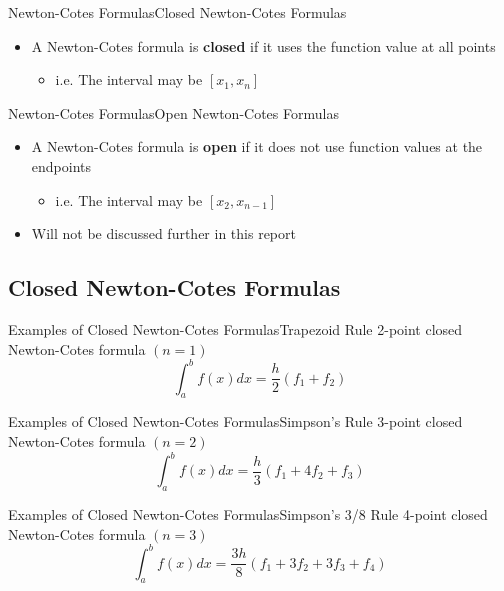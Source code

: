 \documentclass{beamer}
\begin{document}
\begin{frame}{Newton-Cotes Formulas}{Closed Newton-Cotes Formulas}
  \begin{itemize}
    \item A Newton-Cotes formula is \textbf{closed} if it uses the function value at all points
    \begin{itemize}
      \item i.e. The interval may be $[x_1,x_n]$
    \end{itemize} 
  \end{itemize}
\end{frame}

\begin{frame}{Newton-Cotes Formulas}{Open Newton-Cotes Formulas}
  \begin{itemize}
    \item A Newton-Cotes formula is \textbf{open} if it does not use function values at the endpoints
    \begin{itemize}
      \item i.e. The interval may be $[x_2,x_{n-1}]$
    \end{itemize} 
    \item Will not be discussed further in this report
  \end{itemize}
\end{frame}

\subsection{Closed Newton-Cotes Formulas}

\begin{frame}{Examples of Closed Newton-Cotes Formulas}{Trapezoid Rule}
    2-point closed Newton-Cotes formula $\left(n = 1\right)$
    \begin{equation}
      \int_a^b f(x) dx = \dfrac{h}{2} \left(f_1 + f_2\right)
    \end{equation}
\end{frame}

\begin{frame}{Examples of Closed Newton-Cotes Formulas}{Simpson's Rule}
    3-point closed Newton-Cotes formula $\left(n = 2\right)$
    \begin{equation}
      \int_a^b f(x) dx = \dfrac{h}{3} \left(f_1 + 4f_2 + f_3\right)
    \end{equation}
\end{frame}

\begin{frame}{Examples of Closed Newton-Cotes Formulas}{Simpson's 3/8 Rule}
    4-point closed Newton-Cotes formula $\left(n = 3\right)$
    \begin{equation}
      \int_a^b f(x) dx = \dfrac{3h}{8} \left(f_1 + 3f_2 + 3f_3 + f_4\right)
    \end{equation}
\end{frame}
\end{document}
